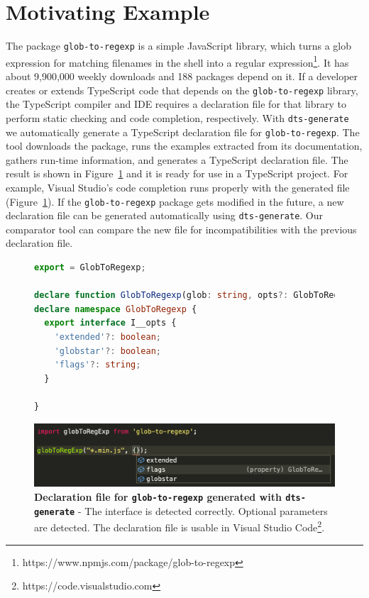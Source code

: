 \documentclass[english,cleveref,autoref,submission]{programming}
\newcommand{\figref}[1]{Figure~\ref{#1}}
\begin{document}
\section{Motivating Example}
\label{sec:motivating-example}
The \NPM{} package \texttt{glob-to-regexp} is a simple JavaScript library, which turns a
glob expression for matching filenames in the shell into a regular
expression\footnote{https://www.npmjs.com/package/glob-to-regexp}. It 
has about 9,900,000 weekly downloads and 188 \NPM{} packages depend on it. If
a developer creates or extends TypeScript code that depends on the
\texttt{glob-to-regexp} library, the TypeScript
compiler and IDE requires a declaration file for that library to
perform static checking and code completion, respectively. With
\texttt{dts-generate} we automatically generate a TypeScript
declaration file for \texttt{glob-to-regexp}. The tool downloads the \NPM{} 
package, runs the examples extracted from its documentation, gathers
run-time information, and generates a TypeScript declaration
file. The result is 
shown in \figref{fig:motivating-example-glob-to-regexp-vscode} and it is
ready for use in a TypeScript project. For example,  Visual Studio's
code completion runs properly with the generated file
(\figref{fig:motivating-example-glob-to-regexp-vscode}). If the
\texttt{glob-to-regexp} package gets modified in the future, a new declaration
file can be generated automatically using
\texttt{dts-generate}. Our comparator tool can compare the new file
for incompatibilities with the previous declaration file.

\begin{figure}[tp]
  \centering
    \begin{lstlisting}[language=TypeScript,numbers=none]
export = GlobToRegexp;

declare function GlobToRegexp(glob: string, opts?: GlobToRegexp.I__opts): RegExp;
declare namespace GlobToRegexp {
  export interface I__opts {
    'extended'?: boolean;
    'globstar'?: boolean;
    'flags'?: string;
  }

}
    \end{lstlisting}
  \begin{center}
    \includegraphics[width=0.8\linewidth]{motivating-example-glob-to-regexp-vscode.png}
  \end{center}

  \caption{\textbf{Declaration file for \texttt{glob-to-regexp}
      generated with \texttt{dts-generate}} - The interface is
    detected correctly. Optional parameters are detected. The
    declaration file is usable in Visual Studio
    Code\footnote{https://code.visualstudio.com}.} 
  \label{fig:motivating-example-glob-to-regexp-vscode}
\end{figure}
\end{document}
